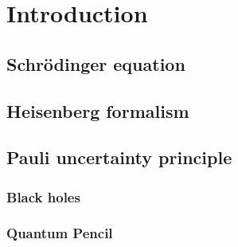\section{Introduction}
	\subsection{Schr\"odinger equation}
	
	\subsection{Heisenberg formalism}
	
	\subsection{Pauli uncertainty principle}
		
		\subsubsection{Black holes}
		\subsubsection{Quantum Pencil}